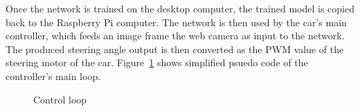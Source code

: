 Once the network is trained on the desktop computer, the trained model
is copied back to the Raspberry Pi computer. The network is then used
by the car's main controller, which feeds an image frame the web
camera as input to the network. The produced steering angle output is
then converted as the PWM value of the steering motor of the
car. Figure~\ref{fig:controlloop} shows simplified psuedo code of the
controller's main loop.

\begin{figure}[t]
  
  \caption{Control loop}
  \label{fig:controlloop}
\end{figure}





